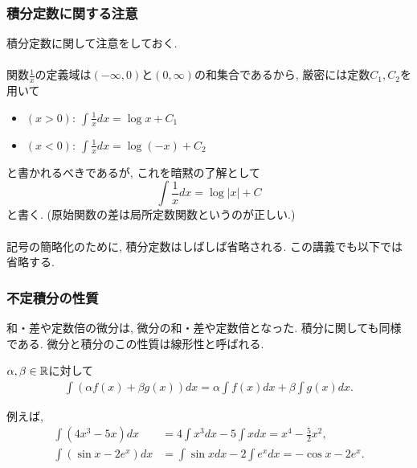 


\begin{frame}
\frametitle{積分定数に関する注意}

積分定数に関して注意をしておく. \\
\ \\

関数$\frac{1}{x}$の定義域は$(-\infty,0)$と$(0,\infty)$の和集合であるから, 厳密には定数$C_1,C_2$を用いて
\begin{itemize}
\item $(x>0): \ \int \frac{1}{x}dx = \log x + C_1$
\item $(x<0): \ \int \frac{1}{x}dx = \log (-x) + C_2$
\end{itemize}
と書かれるべきであるが, これを暗黙の了解として
$$
 \int \frac{1}{x}dx = \log |x| +C
$$
と書く. (原始関数の差は局所定数関数というのが正しい.)\\
\ \\

記号の簡略化のために, 積分定数はしばしば省略される. この講義でも以下では省略する.  

\end{frame}





\begin{frame}
\frametitle{不定積分の性質}

和・差や定数倍の微分は, 微分の和・差や定数倍となった. 
積分に関しても同様である.  
微分と積分のこの性質は線形性と呼ばれる. 

\begin{Thm}
$\alpha, \beta \in \mathbb{R}$に対して
\begin{align*}
\int (\alpha f(x) + \beta g(x))dx = \alpha \int f(x)dx + \beta \int g(x) dx.  
\end{align*}
\end{Thm}

例えば, 
\begin{align*}
\int (4x^3-5x)dx &= 4 \int x^3dx - 5 \int xdx = x^4-\frac{5}{2}x^2, \\
\int (\sin x - 2e^x) dx & = \int \sin x dx - 2 \int e^x dx = -\cos x -2e^x. 
\end{align*}

\end{frame}



